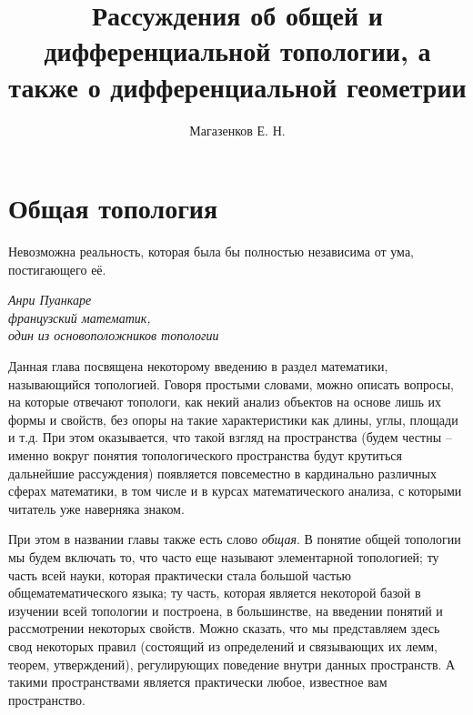 \documentclass[a4paper, 12pt]{book}
\title{Рассуждения об общей и дифференциальной топологии, а также о дифференциальной геометрии}
\author{Магазенков Е. Н.}
\begin{document}
	
	\renewcommand{\contentsname}{\hfillОГЛАВЛЕНИЕ\hfill} 
	\frontmatter
	\titlepage
	
	\doublespacing
	\tableofcontents
	\let\cleardoublepage\clearpage
	\singlespacing
	
	\mainmatter
	
	\pagestyle{style}
	
	
	\chapter{Общая топология}
	\epigraph{Невозможна реальность, которая была бы полностью независима от ума, постигающего её.	\leavevmode
	}{\itshape Анри Пуанкаре\\ французский математик,\\ один из основоположников топологии}
	
    Данная глава посвящена некоторому введению в раздел математики, называющийся топологией. Говоря простыми словами, можно описать вопросы, на которые отвечают топологи, как некий анализ объектов на основе лишь их формы и свойств, без опоры на такие характеристики как длины, углы, площади и т.д. При этом оказывается, что такой взгляд на пространства (будем честны -- именно вокруг понятия топологического пространства будут крутиться дальнейшие рассуждения) появляется повсеместно в кардинально различных сферах математики, в том числе и в курсах математического анализа, с которыми читатель уже наверняка знаком. 

    При этом в названии главы также есть слово \textit{общая}. В понятие общей топологии мы будем включать то, что часто еще называют элементарной топологией; ту часть всей науки, которая практически стала большой частью общематематического языка; ту часть, которая является некоторой базой в изучении всей топологии и построена, в большинстве, на введении понятий и рассмотрении некоторых свойств. Можно сказать, что мы представляем здесь свод некоторых правил (состоящий из определений и связывающих их лемм, теорем, утверждений), регулирующих поведение внутри данных пространств. А такими пространствами является практически любое, известное вам пространство.


	
	
	
	
	
	
	
	
	
	
	
	
	
	
\end{document}
